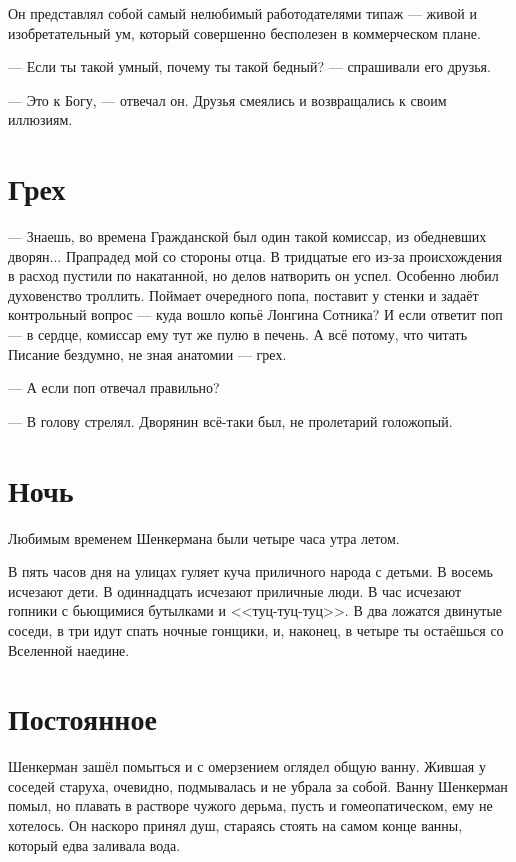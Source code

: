 \documentclass[a4paper,10pt,fleqn]{book}\usepackage{polyglossia}\setdefaultlanguage{english}\setotherlanguage{russian}\defaultfontfeatures{Ligatures=TeX,Mapping=tex-text} \usepackage{xcolor}\definecolor{lightgray}{HTML}{bbbbbb}\color{lightgray}\newcommand{\ml}[3]{\textcolor{black}{#3}}
\begin{document}
Он представлял собой самый нелюбимый работодателями типаж --- живой и изобретательный ум, который совершенно бесполезен в коммерческом плане.

--- Если ты такой умный, почему ты такой бедный? --- спрашивали его друзья.

--- Это к Богу, --- отвечал он.
Друзья смеялись и возвращались к своим иллюзиям.

\section{Грех}

--- Знаешь, во времена Гражданской был один такой комиссар, из обедневших дворян...
Прапрадед мой со стороны отца.
В тридцатые его из-за происхождения в расход пустили по накатанной, но делов натворить он успел.
Особенно любил духовенство троллить.
Поймает очередного попа, поставит у стенки и задаёт контрольный вопрос --- куда вошло копьё Лонгина Сотника?
И если ответит поп --- в сердце, комиссар ему тут же пулю в печень.
А всё потому, что читать Писание бездумно, не зная анатомии --- грех.

--- А если поп отвечал правильно?

--- В голову стрелял.
Дворянин всё-таки был, не пролетарий голожопый.

\section{Ночь}

Любимым временем Шенкермана были четыре часа утра летом.

В пять часов дня на улицах гуляет куча приличного народа с детьми.
В восемь исчезают дети.
В одиннадцать исчезают приличные люди.
В час исчезают гопники с бьющимися бутылками и <<туц-туц-туц>>.
В два ложатся двинутые соседи, в три идут спать ночные гонщики, и, наконец, в четыре ты остаёшься со Вселенной наедине.

\section{Постоянное}

Шенкерман зашёл помыться и с омерзением оглядел общую ванну.
Жившая у соседей старуха, очевидно, подмывалась и не убрала за собой.
Ванну Шенкерман помыл, но плавать в растворе чужого дерьма, пусть и гомеопатическом, ему не хотелось.
Он наскоро принял душ, стараясь стоять на самом конце ванны, который едва заливала вода.
\end{document}
